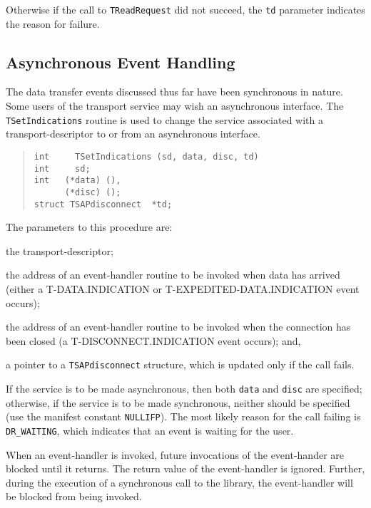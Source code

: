 Otherwise if the call to \verb"TReadRequest" did not succeed,
the \verb"td" parameter indicates the reason for failure.

\subsection	{Asynchronous Event Handling}
The data transfer events discussed thus far have been synchronous in nature.
Some users of the transport service may wish an asynchronous interface.
The \verb"TSetIndications" routine is used to change the service associated
with a transport-descriptor to or from an asynchronous interface.
\begin{quote}\small\begin{verbatim}
int     TSetIndications (sd, data, disc, td)
int     sd;
int   (*data) (),
      (*disc) ();
struct TSAPdisconnect  *td;
\end{verbatim}\end{quote}
The parameters to this procedure are:
\begin{describe}
\item[\verb"sd":] the transport-descriptor;

\item[\verb"data":] the address of an event-handler routine to be invoked when
data has arrived
(either a {\sf T-DATA.INDICATION\/} or {\sf T-EXPEDITED-DATA.INDICATION} event
occurs);

\item[\verb"disc":] the address of an event-handler routine to be invoked when
the connection has been closed
(a {\sf T-DISCONNECT.INDICATION\/} event occurs);
and,

\item[\verb"td":] a pointer to a \verb"TSAPdisconnect" structure, which is
updated only if the call fails.
\end{describe}
If the service is to be made asynchronous,
then both \verb"data" and \verb"disc" are specified;
otherwise,
if the service is to be made synchronous,
neither should be specified (use the manifest constant \verb"NULLIFP").
The most likely reason for the call failing is \verb"DR_WAITING",
which indicates that an event is waiting for the user.

When an event-handler is invoked,
future invocations of the event-hander are blocked until it returns.
The return value of the event-handler is ignored.
Further,
during the execution of a synchronous call to the library,
the event-handler will be blocked from being invoked.

